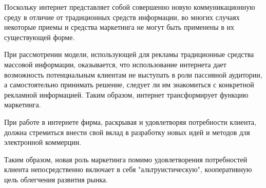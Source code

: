 \documentclass[a4paper,english,russian]{G2-105}
\begin{document}
\par Поскольку интернет представляет собой совершенно новую коммуникационную среду в отличие от традиционных средств информации, во многих случаях некоторые приемы и средства маркетинга не могут быть применены в их существующей форме.
\par При рассмотрении модели, использующей для рекламы традиционные средства массовой информации, оказывается, что использование интернета дает возможность потенциальным клиентам не выступать в роли пассивной аудитории, а самостоятельно принимать решение, следует ли им знакомиться с конкретной рекламной информацией. Таким образом, интернет трансформирует функцию маркетинга.
\par При работе в интернете фирма, раскрывая и удовлетворяя потребности клиента, должна стремиться внести свой вклад в разработку новых идей и методов для электронной коммерции.
\par Таким образом, новая роль маркетинга помимо удовлетворения потребностей клиента непосредственно включает в себя "альтруистическую", кооперативную цель облегчения развития рынка.
\end{document}
